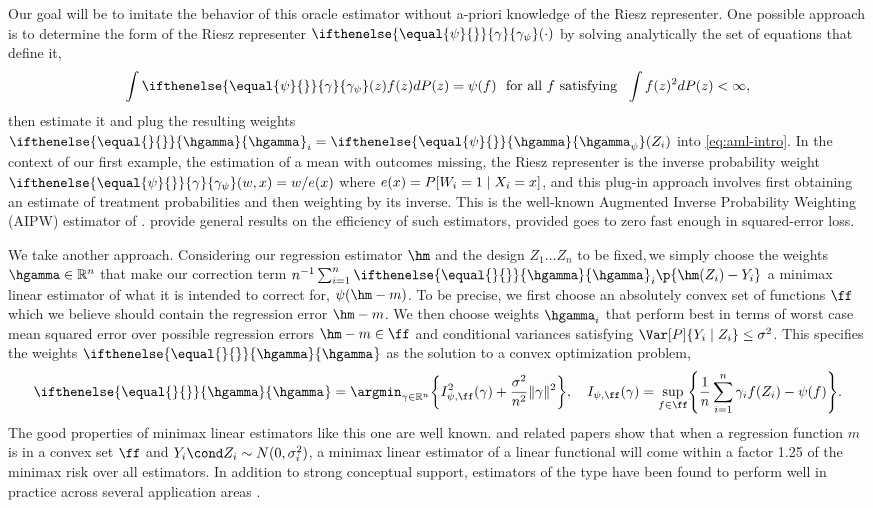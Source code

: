 \documentclass[aos,submission]{imsart}
\theoremstyle{plain}
\theoremstyle{remark}
\newcommand{\riesz}[1][]{\ifthenelse{\equal{#1}{}}{\gamma}{\gamma_{{#1}}}}
\newcommand{\hriesz}[1][]{\ifthenelse{\equal{#1}{}}{\hgamma}{\hgamma_{{#1}}}}
\DeclarePairedDelimiter\norm{\lVert}{\rVert}
\DeclarePairedDelimiter\set{\{}{\}}
\newcommand{\R}{\mathbb{R}}
\begin{document}
Our goal will be to imitate the behavior of this oracle estimator without a-priori knowledge of the Riesz representer. 
One possible approach is to determine the form of the Riesz representer $\riesz[\psi](\cdot)$ by solving
analytically the set of equations that define it, 
\begin{equation}
\label{eq:riesz}
\int \riesz[\psi](z) f(z) d\P(z)  = \psi(f)\ \text{ for all $f$ satisfying }\ \int f(z)^2 d\P(z)  < \infty,
\end{equation}
then estimate it and plug the resulting weights $\hriesz_i = \hriesz[\psi](Z_i)$ into \eqref{eq:aml-intro}. 
In the context of our first example, the estimation of a mean with outcomes missing,
the Riesz representer is the inverse probability weight $\riesz[\psi](w,x) = w/e(x)$ where $e(x) = \P[W_i=1 \mid X_i=x]$, 
and this plug-in approach involves first obtaining an estimate  of
treatment probabilities and then weighting by its inverse.
This is the well-known Augmented Inverse Probability Weighting (AIPW) estimator of \citet{robins1994estimation}. 
\citet{chernozhukov2016double} provide general results on the efficiency of
such estimators, provided \smash{$\hriesz[\psi](Z_i) - \riesz[\psi](Z_i)$} goes to zero fast enough in squared-error loss.

We take another approach. Considering our regression estimator $\hm$ and the design $Z_1 \ldots Z_n$ to be fixed,\footnotemark\,we
simply choose the weights $\hgamma \in \R^n$ that make our correction term $n^{-1} \sum_{i = 1}^n \hriesz_i \p{\hm(Z_i) - Y_i}$
a minimax linear estimator of what it is intended to correct for, $\psi(\hm-m)$.
To be precise, we first choose an absolutely convex set of functions $\ff$ which we
believe should contain the regression error $\hm - m$.
We then choose weights $\hgamma_i$ that perform best in terms of worst case mean squared error
over possible regression errors $\hm - m \in \ff$
and conditional variances satisfying $\Var[P]{Y_i \mid Z_i} \le \sigma^2$. 
This specifies the weights $\hriesz$ as the solution to a convex optimization problem,
\begin{equation*}
\hriesz = \argmin_{\gamma \in \R^n}\set*{ I_{\psi,\ff}^2(\gamma) + \frac{\sigma^2}{n^2}\norm{\gamma}^2 },
\quad I_{\psi,\ff}(\gamma) = \sup_{f \in \ff}\set*{\frac{1}{n} \sum_{i = 1}^n \gamma_i f(Z_i) - \psi(f)}.
\end{equation*}
The good properties of minimax linear estimators like this one are well known. \citet{donoho1994statistical} and related papers
\citep{armstrong2015optimal,cai2003note,donoho1991geometrizing,ibragimov1985nonparametric,
johnstone2015-gaussian-sequence,juditsky2009nonparametric} show that when a regression function $m$ is in a convex set $\ff$ and $Y_i \cond Z_i \sim N(0,\sigma_i^2)$,
a minimax linear estimator of a linear functional  will come within a factor 1.25 of the minimax risk over all estimators.
In addition to strong conceptual support, estimators of the type have been found to perform well
in practice across several application areas \citep{armstrong2015optimal,imbens2017optimized,zubizarreta2015stable}.
\end{document}
